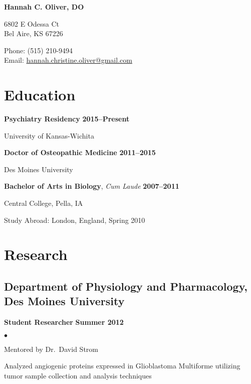 \documentclass[11pt,letterpaper]{article}
\def\name{Hannah C. Oliver, DO}
\renewenvironment{itemize}{
  \begin{list}{}{
      \setlength{\leftmargin}{1.5em}
      \setlength{\itemsep}{0.25em}
      \setlength{\parskip}{0pt}
      \setlength{\parsep}{0.25em}
    }
  }{
  \end{list}
}
\newenvironment{bitemize}{
  \begin{list}{\(\bullet \)}{
      \setlength{\leftmargin}{1.5em}
      \setlength{\itemsep}{0.25em}
      \setlength{\parskip}{0pt}
      \setlength{\parsep}{0.25em}
    }
  }{
  \end{list}
}
\newcommand{\yearrange}[1]{\hfill \textbf{#1} \par}
\begin{document}

\centerline{\huge \bf \name}

\bigskip

\noindent
\begin{minipage}[t]{0.49\textwidth}
  6802 E Odessa Ct\\
  Bel Aire, KS 67226
\end{minipage}
\begin{minipage}[t]{0.5\textwidth}
  \hfill Phone: (515) 210-9494\\ %
  \hspace*{0pt} \hfill Email: \href{mailto:hannah.christine.oliver@gmail.com}{hannah.christine.oliver@gmail.com}
\end{minipage}

\section*{Education}

\begin{itemize}
\item \textbf{Psychiatry Residency} \yearrange{2015--Present}
  University of Kansas-Wichita
\item \textbf{Doctor of Osteopathic Medicine} \yearrange{2011--2015} \par
  Des Moines University 
\item \textbf{Bachelor of Arts in Biology}, \textit{Cum Laude} \yearrange{2007--2011} \par
  Central College, Pella, IA
  \begin{itemize} 
    \item {Study Abroad:} London, England, Spring 2010
    \end{itemize}
  \end{itemize}

\section*{Research}

\subsection*{Department of Physiology and Pharmacology, Des Moines University}
\begin{itemize}
\item \textbf{Student Researcher} \yearrange{Summer 2012}
  \begin{bitemize}
  \item Mentored by Dr.\ David Strom
  \item Analyzed angiogenic proteins expressed in Glioblastoma
    Multiforme utilizing tumor sample collection and analysis
    techniques
  \end{bitemize}
\end{itemize}
\end{document}
